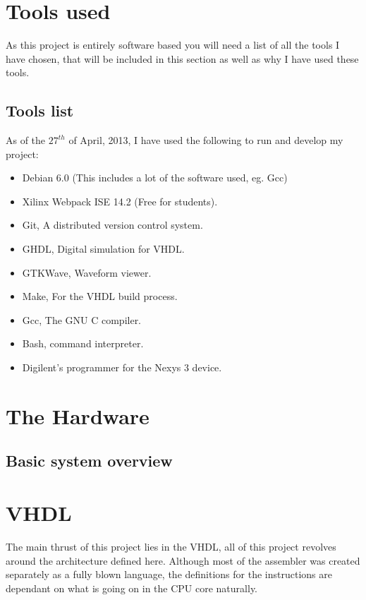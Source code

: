 \documentclass	[a4paper, 10pt]	{article}
\begin{document}
  \section{Tools used}
  
  As this project is entirely software based you will need a list of all the tools
  I have chosen, that will be included in this section as well as why I have used
  these tools.

    \subsection{Tools list}

    As of the $27^{th}$ of April, 2013, I have used the following to run and develop
    my project:

    \begin{itemize}
      \item Debian 6.0 (This includes a lot of the software used, eg. Gcc)
      \item Xilinx Webpack ISE 14.2 (Free for students).
      \item Git, A distributed version control system.
      \item GHDL, Digital simulation for VHDL.
      \item GTKWave, Waveform viewer.
      \item Make, For the VHDL build process.
      \item Gcc, The GNU C compiler.
      \item Bash, command interpreter.
      \item Digilent's programmer for the Nexys 3 device.
    \end{itemize}


  \section{The Hardware}

  \subsection{Basic system overview}

  \section{VHDL}

  The main thrust of this project lies in the VHDL, all of this project revolves around
  the architecture defined here. Although most of the assembler was created separately
  as a fully blown language, the definitions for the instructions are dependant on what 
  is going on in the CPU core naturally.
\end{document}

